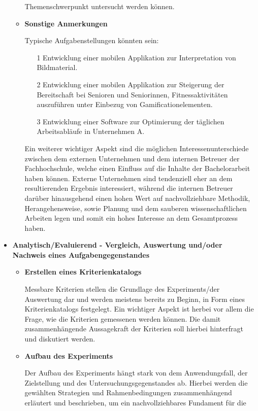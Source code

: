 \documentclass{scrreprt}
\begin{document}
\begin{itemize}
\begin{itemize}
	Themenschwerpunkt untersucht werden können.
	\item \textbf{Sonstige Anmerkungen}
	\par Typische Aufgabenstellungen könnten sein:
	\begin{itemize}
		\item[1] Entwicklung einer mobilen Applikation zur Interpretation von Bildmaterial.
		\item[2] Entwicklung einer mobilen Applikation zur Steigerung der Bereitschaft bei 
		Senioren und Seniorinnen, Fitnessaktivitäten auszuführen unter Einbezug von 
		Gamificationelementen.
		\item[3] Entwicklung einer Software zur Optimierung der täglichen Arbeitsabläufe in 
		Unternehmen A.
	\end{itemize}
	
	\par Ein weiterer wichtiger Aspekt sind die möglichen Interessenunterschiede zwischen dem 
	externen Unternehmen und dem internen Betreuer der Fachhochschule, welche einen 
	Einfluss auf die Inhalte der Bachelorarbeit haben können. Externe Unternehmen sind 
	tendenziell eher an dem resultierenden Ergebnis interessiert, während die internen Betreuer 
	darüber hinausgehend einen hohen Wert auf nachvollziehbare Methodik, Herangehensweise, 
	sowie Planung und dem sauberen wissenschaftlichen Arbeiten legen und somit ein  hohes 
	Interesse an dem Gesamtprozess haben.
	\end{itemize}
\item \textbf{Analytisch/Evaluierend - Vergleich, Auswertung und/oder Nachweis eines Aufgabengegenstandes}
	\begin{itemize}
	\item \textbf{Erstellen eines Kriterienkatalogs}
	\par Messbare Kriterien stellen die Grundlage des Experiments/der Auswertung dar und werden 
	meistens bereits zu Beginn, in Form eines Kriterienkatalogs festgelegt. 
	Ein wichtiger Aspekt ist herbei vor allem die Frage, wie die Kriterien gemessenen werden 
	können. Die damit zusammenhängende Aussagekraft der Kriterien soll hierbei hinterfragt und 
	diskutiert werden.
	\item \textbf{Aufbau des Experiments}
	\par Der Aufbau des Experiments hängt stark von dem Anwendungsfall, der Zielstellung und des 
	Untersuchungsgegenstandes ab. Hierbei werden die gewählten Strategien und Rahmenbedingungen 
	zusammenhängend erläutert und beschrieben, um ein nachvollziehbares Fundament für die 

\end{itemize}
\end{itemize}
\end{document}

